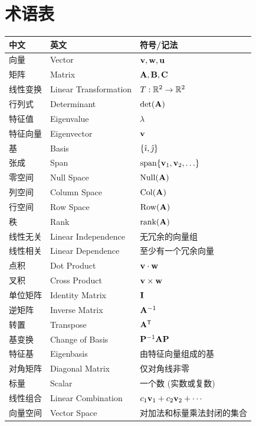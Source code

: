 \appendix
\chapter{术语表}

\begin{center}
\begin{tabular}{l|l|l}
\toprule
\textbf{中文} & \textbf{英文} & \textbf{符号/记法} \\
\midrule
向量 & Vector & $\mathbf{v}, \mathbf{w}, \mathbf{u}$ \\
矩阵 & Matrix & $\mathbf{A}, \mathbf{B}, \mathbf{C}$ \\
线性变换 & Linear Transformation & $T: \mathbb{R}^2 \to \mathbb{R}^2$ \\
行列式 & Determinant & $\det(\mathbf{A})$ \\
特征值 & Eigenvalue & $\lambda$ \\
特征向量 & Eigenvector & $\mathbf{v}$ \\
基 & Basis & $\{\hat{\imath}, \hat{\jmath}\}$ \\
张成 & Span & $\operatorname{span}\{\mathbf{v}_1, \mathbf{v}_2, \ldots\}$ \\
零空间 & Null Space & $\operatorname{Null}(\mathbf{A})$ \\
列空间 & Column Space & $\operatorname{Col}(\mathbf{A})$ \\
行空间 & Row Space & $\operatorname{Row}(\mathbf{A})$ \\
秩 & Rank & $\operatorname{rank}(\mathbf{A})$ \\
线性无关 & Linear Independence & 无冗余的向量组 \\
线性相关 & Linear Dependence & 至少有一个冗余向量 \\
点积 & Dot Product & $\mathbf{v} \cdot \mathbf{w}$ \\
叉积 & Cross Product & $\mathbf{v} \times \mathbf{w}$ \\
单位矩阵 & Identity Matrix & $\mathbf{I}$ \\
逆矩阵 & Inverse Matrix & $\mathbf{A}^{-1}$ \\
转置 & Transpose & $\mathbf{A}^{\mathsf{T}}$ \\
基变换 & Change of Basis & $\mathbf{P}^{-1} \mathbf{A} \mathbf{P}$ \\
特征基 & Eigenbasis & 由特征向量组成的基 \\
对角矩阵 & Diagonal Matrix & 仅对角线非零 \\
标量 & Scalar & 一个数 (实数或复数) \\
线性组合 & Linear Combination & $c_1\mathbf{v}_1 + c_2\mathbf{v}_2 + \cdots$ \\
向量空间 & Vector Space & 对加法和标量乘法封闭的集合 \\
\bottomrule
\end{tabular}
\end{center}


